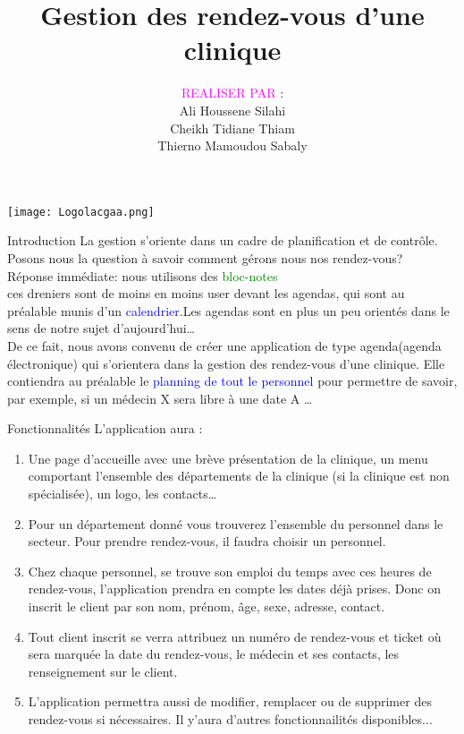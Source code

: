 \documentclass{beamer}
\title[Projet de fin d'année]{Gestion des rendez-vous d'une clinique}
\institute[L1-TDSI]{Faculté des Sciences et Technique(FST)/Département Maths-Info\\Laboratoire d'Algèbre de Cryptographie de Géométrie Algébrique et Application(LACGAA)\\Transmission des Données et Sécurité de l'Information\\(TDSI)}
\author[Licence 1 / 2018]{\textcolor{magenta}{REALISER PAR} :\\Ali Houssene Silahi\\Cheikh Tidiane Thiam\\Thierno Mamoudou Sabaly}
\date{}
\begin{document}
\begin{frame}
\texttt{[image: Logolacgaa.png]}
\titlepage
\end{frame}
\begin{frame}{Introduction}
La gestion  s’oriente dans un cadre de planification et de contrôle. \pause
Posons nous la question à savoir comment gérons nous nos rendez-vous?\\ \pause
Réponse  immédiate: nous utilisons des \textcolor{green}{ bloc-notes}\\ \pause
ces dreniers sont  de moins en moins user devant  les agendas, qui sont au préalable munis d'un \textcolor{blue}{calendrier}.Les agendas sont en plus un peu orientés dans le sens de notre sujet d'aujourd'hui…\\ \pause
De ce fait, nous avons convenu de créer une application de type agenda(agenda électronique)  qui s’orientera dans la gestion  des rendez-vous d’une clinique. \pause Elle contiendra au préalable le \textcolor{blue}{planning de tout le personnel} pour permettre de savoir, par exemple, si un médecin X sera libre à une date A …
\end{frame}

\begin{frame}{Fonctionnalités}
L’application aura :\\
\begin{enumerate}
\item Une page d’accueille avec une brève présentation de la clinique, un menu comportant l’ensemble des départements de la clinique (si la clinique est non spécialisée), un logo, les contacts… \pause
\item Pour un département donné vous trouverez l’ensemble du personnel dans le secteur. Pour prendre rendez-vous, il faudra choisir un personnel.\pause
\item Chez chaque personnel, se trouve son emploi du temps avec ces heures de rendez-vous, l’application prendra en compte les dates déjà prises. Donc on inscrit le client par son nom, prénom, âge, sexe, adresse, contact. \pause
\item Tout client inscrit se verra attribuez un numéro de rendez-vous et ticket où sera marquée la date du rendez-vous, le médecin et ses contacts,  les renseignement sur le client.\pause
\item  L’application permettra aussi  de modifier, remplacer ou de supprimer des rendez-vous si nécessaires. Il y'aura d'autres fonctionnailités disponibles...
\end{enumerate}
\end{frame}
\end{document}
